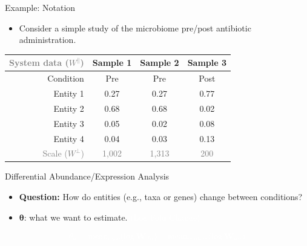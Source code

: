 \documentclass[
  ignorenonframetext,
]{beamer}
\providecommand{\tightlist}{%
  \setlength{\itemsep}{0pt}\setlength{\parskip}{0pt}}
\begin{document}
\begin{frame}{Example: Notation}
\protect\hypertarget{example-notation}{}
\begin{itemize}
\tightlist
\item
  Consider a simple study of the microbiome pre/post antibiotic
  administration.
\end{itemize}

\vspace{0.05in}

\begin{table}[h!]
\centering
\begin{tabular}{|r|c c c| }
\hline
\textcolor{gray}{System data ($W^\parallel$)} & Sample 1 & Sample 2 & Sample 3\\
\hline
Condition & Pre & Pre & Post\\
\hline
Entity 1 & 0.27 & 0.27 & 0.77 \\
Entity 2 & 0.68 & 0.68 & 0.02 \\
Entity 3 & 0.05 & 0.02 & 0.08 \\
Entity 4 & 0.04 & 0.03  & 0.13 \\
\hline
\textcolor{gray}{Scale ($W^\perp$)} & \textcolor{gray}{1,002} & \textcolor{gray}{1,313} & \textcolor{gray}{200}\\
\hline
\end{tabular}
\end{table}
\end{frame}

\begin{frame}{Differential Abundance/Expression Analysis}
\protect\hypertarget{differential-abundanceexpression-analysis}{}
\begin{itemize}
\item
  \textbf{Question:} How do entities (e.g., taxa or genes) change
  between conditions?
\item
  \(\boldsymbol{\theta}\): what we want to estimate.
  \textcolor{white}{(Log Fold Change)}
\end{itemize}

\vspace{.125in}

\begin{equation*}
\textcolor{white}{\theta_d = \text{mean}_{\text{case}}(\log \mathbf{W}_{dn}) - \text{mean}_{\text{control}}(\log \mathbf{W}_{dn})}
\end{equation*}
\end{frame}
\end{document}
